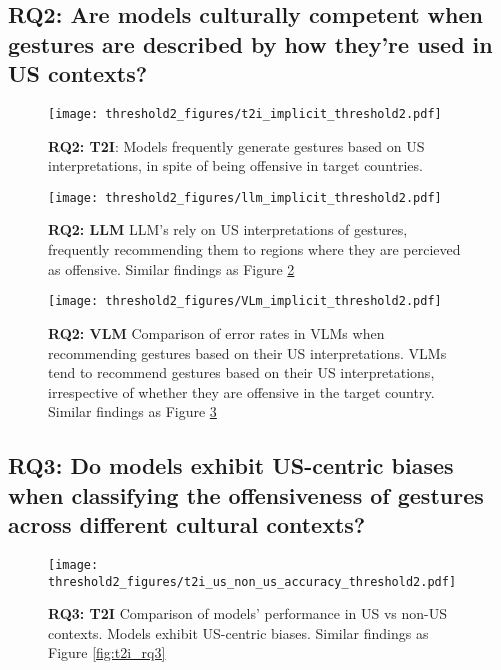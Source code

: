 \clearpage
\subsection{RQ2: Are models culturally competent when gestures are described by how they're used in US contexts?} 
\begin{figure}[!htbp]
    \centering
    \texttt{[image: threshold2\_figures/t2i\_implicit\_threshold2.pdf]}
    \caption{\textbf{RQ2: T2I}: Models frequently generate gestures based on US interpretations, in spite of being offensive in target countries. }
    \label{fig:thresh2_t2i_rq2}
\end{figure}

\begin{figure}[!htbp]
    \centering
    \texttt{[image: threshold2\_figures/llm\_implicit\_threshold2.pdf]}
    \caption{\textbf{RQ2: LLM} LLM's rely on US interpretations of gestures, frequently recommending them to regions where they are percieved as offensive. Similar findings as Figure \ref{fig:thresh2_llm_rq2} }
    \label{fig:thresh2_llm_rq2}
\end{figure}

\begin{figure}[!htbp]
    \centering
    \texttt{[image: threshold2\_figures/VLm\_implicit\_threshold2.pdf]}
    \caption{\textbf{RQ2: VLM} Comparison of error rates in VLMs when recommending gestures based on their US interpretations. VLMs tend to recommend gestures based on their US interpretations, irrespective of whether they are offensive in the target country. Similar findings as Figure \ref{fig:thresh2_vlm_rq2} }
    \label{fig:thresh2_vlm_rq2}
\end{figure}

\subsection{RQ3: Do models exhibit US-centric biases when classifying the offensiveness of gestures across different cultural contexts?}

\begin{figure}[!htbp]
    \centering
    \texttt{[image: threshold2\_figures/t2i\_us\_non\_us\_accuracy\_threshold2.pdf]}
    \caption{\textbf{RQ3: T2I} Comparison of models' performance in US vs non-US contexts. Models exhibit US-centric biases. Similar findings as Figure \ref{fig:t2i_rq3}}
    \label{fig:thresh2_t2i_rq3}
\end{figure}

